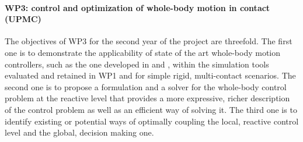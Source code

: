 \paragraph{WP3: control and optimization of whole-body motion in contact (UPMC)}

The objectives of WP3 for the second year of the project are threefold. The first one is to demonstrate the applicability of state of the art whole-body motion controllers, such as the one developed in \cite{salini2012} and \cite{delprete2013}, within the simulation tools evaluated and retained in WP1 and for simple rigid, multi-contact scenarios. The second one is to propose a formulation and a solver for the whole-body control problem at the reactive level that provides a more expressive, richer description of the control problem as well as an efficient way of solving it. The third one is to identify existing or potential ways of optimally coupling the local, reactive control level and the global, decision making one.